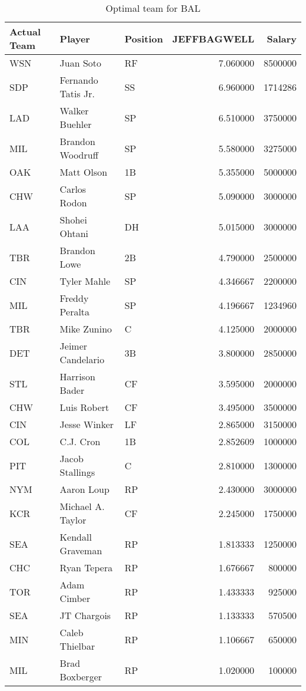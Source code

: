 \begin{table}

\caption{Optimal team for BAL}
\centering
\begin{tabular}[t]{l|l|l|r|r}
\hline
Actual Team & Player & Position & JEFFBAGWELL & Salary\\
\hline
WSN & Juan Soto & RF & 7.060000 & 8500000\\
\hline
SDP & Fernando Tatis Jr. & SS & 6.960000 & 1714286\\
\hline
LAD & Walker Buehler & SP & 6.510000 & 3750000\\
\hline
MIL & Brandon Woodruff & SP & 5.580000 & 3275000\\
\hline
OAK & Matt Olson & 1B & 5.355000 & 5000000\\
\hline
CHW & Carlos Rodon & SP & 5.090000 & 3000000\\
\hline
LAA & Shohei Ohtani & DH & 5.015000 & 3000000\\
\hline
TBR & Brandon Lowe & 2B & 4.790000 & 2500000\\
\hline
CIN & Tyler Mahle & SP & 4.346667 & 2200000\\
\hline
MIL & Freddy Peralta & SP & 4.196667 & 1234960\\
\hline
TBR & Mike Zunino & C & 4.125000 & 2000000\\
\hline
DET & Jeimer Candelario & 3B & 3.800000 & 2850000\\
\hline
STL & Harrison Bader & CF & 3.595000 & 2000000\\
\hline
CHW & Luis Robert & CF & 3.495000 & 3500000\\
\hline
CIN & Jesse Winker & LF & 2.865000 & 3150000\\
\hline
COL & C.J. Cron & 1B & 2.852609 & 1000000\\
\hline
PIT & Jacob Stallings & C & 2.810000 & 1300000\\
\hline
NYM & Aaron Loup & RP & 2.430000 & 3000000\\
\hline
KCR & Michael A. Taylor & CF & 2.245000 & 1750000\\
\hline
SEA & Kendall Graveman & RP & 1.813333 & 1250000\\
\hline
CHC & Ryan Tepera & RP & 1.676667 & 800000\\
\hline
TOR & Adam Cimber & RP & 1.433333 & 925000\\
\hline
SEA & JT Chargois & RP & 1.133333 & 570500\\
\hline
MIN & Caleb Thielbar & RP & 1.106667 & 650000\\
\hline
MIL & Brad Boxberger & RP & 1.020000 & 100000\\
\hline
\end{tabular}
\end{table}
